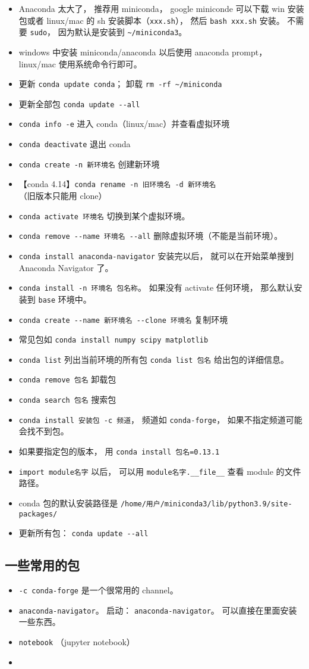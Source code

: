 
\begin{itemize}
\item Anaconda 太大了， 推荐用 miniconda， google miniconde 可以下载 win 安装包或者 linux/mac 的 sh 安装脚本（\verb|xxx.sh|）， 然后 \verb|bash xxx.sh| 安装。 不需要 \verb|sudo|， 因为默认是安装到 \verb|~/miniconda3|。
\item windows 中安装 miniconda/anaconda 以后使用 anaconda prompt， linux/mac 使用系统命令行即可。
\item 更新 \verb|conda update conda|； 卸载 \verb|rm -rf ~/miniconda|
\item 更新全部包 \verb|conda update --all|
\item \verb|conda info -e| 进入 conda（linux/mac）并查看虚拟环境
\item \verb|conda deactivate| 退出 conda
\item \verb|conda create -n 新环境名| 创建新环境
\item 【conda 4.14】\verb|conda rename -n 旧环境名 -d 新环境名| （旧版本只能用 clone）
\item \verb|conda activate 环境名| 切换到某个虚拟环境。
\item \verb|conda remove --name 环境名 --all| 删除虚拟环境（不能是当前环境）。
\item \verb|conda install anaconda-navigator| 安装完以后， 就可以在开始菜单搜到 Anaconda Navigator 了。
\item \verb|conda install -n 环境名 包名称|。 如果没有 activate 任何环境， 那么默认安装到 \verb|base| 环境中。
\item \verb|conda create --name 新环境名 --clone 环境名| 复制环境
\item 常见包如 \verb|conda install numpy scipy matplotlib|
\item \verb|conda list| 列出当前环境的所有包 \verb|conda list 包名| 给出包的详细信息。
\item \verb|conda remove 包名| 卸载包
\item \verb|conda search 包名| 搜索包
\item \verb|conda install 安装包 -c 频道|， 频道如 \verb|conda-forge|， 如果不指定频道可能会找不到包。
\item 如果要指定包的版本， 用 \verb|conda install 包名=0.13.1|
\item \verb|import module名字| 以后， 可以用 \verb|module名字.__file__| 查看 module 的文件路径。
\item conda 包的默认安装路径是 \verb|/home/用户/miniconda3/lib/python3.9/site-packages/|
\item 更新所有包： \verb|conda update --all|
\end{itemize}

\subsection{一些常用的包}
\begin{itemize}
\item \verb|-c conda-forge| 是一个很常用的 channel。
\item \verb|anaconda-navigator|。 启动： \verb|anaconda-navigator|。 可以直接在里面安装一些东西。
\item \verb|notebook| （jupyter notebook）
\item 
\end{itemize}
